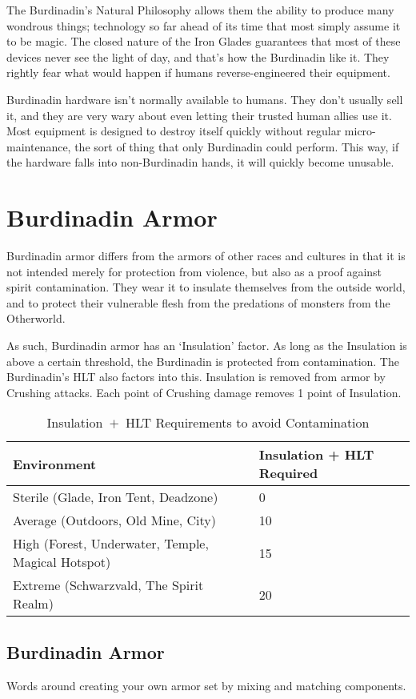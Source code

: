 \documentclass[oneside,11pt,english]{book}
\begin{document}
The Burdinadin’s Natural Philosophy allows them the ability to produce many wondrous things; 
technology so far ahead of its time that most simply assume it to be magic. The closed nature of the Iron 
Glades guarantees that most of these devices never see the light of day, and that’s how the Burdinadin 
like it. They rightly fear what would happen if humans reverse-engineered their equipment.

Burdinadin hardware isn’t normally available to humans. They don’t usually sell it, and they are very 
wary about even letting their trusted human allies use it. Most equipment is designed to destroy itself 
quickly without regular micro-maintenance, the sort of thing that only Burdinadin could perform. This 
way, if the hardware falls into non-Burdinadin hands, it will quickly become unusable. 

\section{Burdinadin Armor}
Burdinadin armor differs from the armors of other races and cultures in that it is not intended merely for 
protection from violence, but also as a proof against spirit contamination. They wear it to insulate 
themselves from the outside world, and to protect their vulnerable flesh from the predations of monsters 
from the Otherworld. 

As such, Burdinadin armor has an ‘Insulation’ factor. As long as the Insulation is above a certain threshold, the Burdinadin is protected from contamination. The Burdinadin’s HLT also factors into this. 
Insulation is removed from armor by Crushing attacks. Each point of Crushing damage removes 1 point of Insulation. 

\begin{table}
	\centering
	\caption{Insulation~$+$~HLT Requirements to avoid Contamination}
	\label{tab:Insulation Requirements}
	\begin{tabu} spread 0pt {XX[-1]}
Environment&Insulation + HLT Required\\\toprule
Sterile (Glade, Iron Tent, Deadzone)&0\\
Average (Outdoors, Old Mine, City)&10\\
High (Forest, Underwater, Temple, Magical Hotspot)&15 \\
Extreme (Schwarzvald, The Spirit Realm)& 20\\
	\end{tabu}
\end{table}
\subsection{Burdinadin Armor}
Words around creating your own armor set by mixing and matching components.
\end{document}
